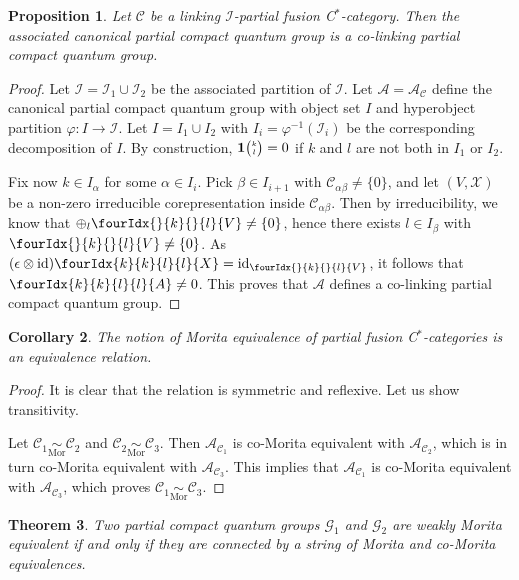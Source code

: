 \documentclass[11pt]{article}
\DeclareMathOperator{\id}{id}
\newcommand{\CatC}{\mathcal{C}}
\newcommand{\CatCC}{\mathscr{C}}
\newcommand{\Grt}[3]{#1{\tiny {\begin{pmatrix} #2\\#3\end{pmatrix}}}}
\newcommand{\UnitC}[2]{\Grt{\mathbf{1}}{#1}{#2}}
\newcommand{\Gr}[5]{\fourIdx{#2}{#4}{#3}{#5}{#1}}%
\newcommand{\Gru}[3]{\Gr{#1}{}{}{#2}{#3}}
\newtheorem{Theorem}{Theorem}[section]
\newtheorem{Prop}[Theorem]{Proposition}
\newtheorem{Cor}[Theorem]{Corollary}
\theoremstyle{definition}
\numberwithin{equation}{section}
\begin{document}
\begin{Prop}\label{PropCoLink} Let $\CatCC$ be a linking $\mathscr{I}$-partial fusion C$^*$-category. Then the associated canonical partial compact quantum group is a co-linking partial compact quantum group. 
\end{Prop} 

\begin{proof} Let $\mathscr{I}= \mathscr{I}_1\cup \mathscr{I}_2$ be the associated partition of $\mathscr{I}$. Let $\mathscr{A} = \mathscr{A}_{\CatCC}$ define the canonical partial compact quantum group with object set $I$ and hyperobject partition $\varphi:I\rightarrow \mathscr{I}$. Let $I=I_1\cup I_2$ with $I_i = \varphi^{-1}(\mathscr{I}_i)$ be the corresponding decomposition of $I$. By construction, $\UnitC{k}{l}=0$ if $k$ and $l$ are not both in $I_1$ or $I_2$. 

Fix now $k\in I_{\alpha}$ for some $\alpha \in I_i$. Pick $\beta\in I_{i+1}$ with $\CatC_{\alpha\beta}\neq\{0\}$, and let $(V,\mathscr{X})$ be a non-zero irreducible corepresentation inside $\CatC_{\alpha\beta}$. Then by irreducibility, we know that $\oplus_l \Gru{V}{k}{l} \neq \{0\}$, hence there exists $l\in I_{\beta}$ with $\Gru{V}{k}{l}\neq \{0\}$. As $(\epsilon\otimes \id)\Gr{X}{k}{l}{k}{l} = \id_{\Gru{V}{k}{l}}$, it follows that $\Gr{A}{k}{l}{k}{l} \neq 0$. This proves that $\mathscr{A}$ defines a co-linking partial compact quantum group.
\end{proof} 

\begin{Cor} The notion of Morita equivalence of partial fusion C$^*$-categories is an equivalence relation.
\end{Cor} 
\begin{proof}  It is clear that the relation is symmetric and reflexive. Let us show transitivity.

Let $\CatCC_1\underset{\textrm{Mor}}{\sim} \CatCC_2$ and $\CatCC_2\underset{\textrm{Mor}}{\sim} \CatCC_3$. Then $\mathscr{A}_{\CatCC_1}$ is co-Morita equivalent with  $\mathscr{A}_{\CatCC_2}$, which is in turn co-Morita equivalent with $\mathscr{A}_{\CatCC_3}$. This implies that $\mathscr{A}_{\CatCC_1}$ is co-Morita equivalent with $\mathscr{A}_{\CatCC_3}$, which proves $\CatCC_1\underset{\textrm{Mor}}{\sim} \CatCC_3$.
\end{proof} 

\begin{Theorem} Two partial compact quantum groups $\mathscr{G}_1$ and $\mathscr{G}_2$ are weakly Morita equivalent if and only if they are connected by a string of Morita and co-Morita equivalences. 
\end{Theorem}
\end{document}

